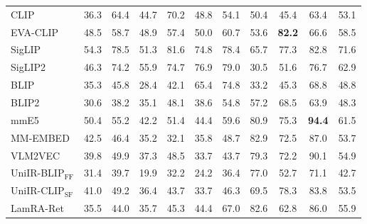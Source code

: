 \begin{tabular}{lcccccccccc}
CLIP & 36.3 & 64.4 & 44.7 & 70.2 & 48.8 & 54.1 & 50.4 & 45.4 & 63.4 & 53.1 \\
EVA-CLIP & 48.5 & 58.7 & 48.9 & 57.4 & 50.0 & 60.7 & 53.6 & \textbf{82.2} & 66.6 & 58.5\\
SigLIP & 54.3 & 78.5 & 51.3 & 81.6 & 74.8 & 78.4 & 65.7 & 77.3 & 82.8 & 71.6 \\
SigLIP2 & 46.3 & 74.2 & 55.9 & 74.7 & 76.9 & 79.0 & 30.5 & 51.6 & 76.7 & 62.9 \\
BLIP & 35.3 & 45.8 & 28.4 & 42.1 & 65.4 & 74.8 & 33.2 & 45.3 & 68.8 & 48.8 \\
BLIP2 & 30.6 & 38.2 & 35.1 & 48.1 & 38.6 & 54.8 & 57.2 & 68.5 & 63.9 & 48.3\\
mmE5 & 50.4 & 55.2 & 42.2 & 51.4 & 44.4 & 59.6 & 80.9 & 75.3 & \textbf{94.4} & 61.5\\
MM-EMBED & 42.5 & 46.4 & 35.2 & 32.1 & 35.8 & 48.7 & 82.9 & 72.5 & 87.0 & 53.7\\
VLM2VEC & 39.8 & 49.9 & 37.3 & 48.5 & 33.7 & 43.7 & 79.3 & 72.2 & 90.1 & 54.9 \\
UniIR-BLIP$_{\text{FF}}$ & 31.4 & 39.7 & 19.9 & 32.2 & 24.2 & 36.4 & 77.0 & 52.7 & 71.1 & 42.7 \\
UniIR-CLIP$_{\text{SF}}$ & 41.0 & 49.2 & 36.4 & 43.7 & 33.7 & 46.3 & 69.5 & 78.3 & 83.8 & 53.5 \\
LamRA-Ret & 35.5 & 44.0 & 35.7 & 45.3 & 44.4 & 67.0 & 82.6 & 62.8 & 86.0 & 55.9 \\


\end{tabular}
